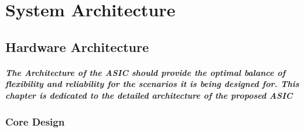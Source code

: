 \documentclass[12pt,a4paper]{report}
\begin{document}







\chapter{System Architecture}
\section{Hardware Architecture}
\paragraph{\textrm{\textmd{The Architecture of the ASIC should provide the optimal balance of flexibility and reliability for the scenarios it is being designed for. This chapter is dedicated to the detailed architecture of the proposed ASIC}}}
\subsection{Core Design}
\end{document}
